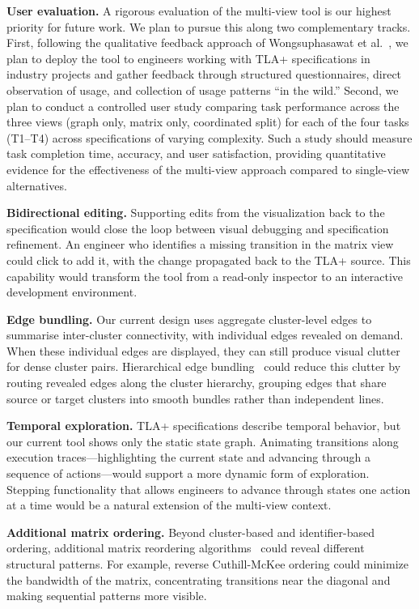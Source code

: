 \documentclass[conference]{IEEEtran}
\begin{document}
\textbf{User evaluation.} A rigorous evaluation of the multi-view tool is our highest priority for future work. We plan to pursue this along two complementary tracks. First, following the qualitative feedback approach of Wongsuphasawat et al.~\cite{wongsuphasawat2018tensorflow}, we plan to deploy the tool to engineers working with TLA+ specifications in industry projects and gather feedback through structured questionnaires, direct observation of usage, and collection of usage patterns ``in the wild.'' Second, we plan to conduct a controlled user study comparing task performance across the three views (graph only, matrix only, coordinated split) for each of the four tasks (T1--T4) across specifications of varying complexity. Such a study should measure task completion time, accuracy, and user satisfaction, providing quantitative evidence for the effectiveness of the multi-view approach compared to single-view alternatives.

\textbf{Bidirectional editing.} Supporting edits from the visualization back to the specification would close the loop between visual debugging and specification refinement. An engineer who identifies a missing transition in the matrix view could click to add it, with the change propagated back to the TLA+ source. This capability would transform the tool from a read-only inspector to an interactive development environment.

\textbf{Edge bundling.} Our current design uses aggregate cluster-level edges to summarise inter-cluster connectivity, with individual edges revealed on demand. When these individual edges are displayed, they can still produce visual clutter for dense cluster pairs. Hierarchical edge bundling~\cite{holten2006hierarchical} could reduce this clutter by routing revealed edges along the cluster hierarchy, grouping edges that share source or target clusters into smooth bundles rather than independent lines.

\textbf{Temporal exploration.} TLA+ specifications describe temporal behavior, but our current tool shows only the static state graph. Animating transitions along execution traces---highlighting the current state and advancing through a sequence of actions---would support a more dynamic form of exploration. Stepping functionality that allows engineers to advance through states one action at a time would be a natural extension of the multi-view context.

\textbf{Additional matrix ordering.} Beyond cluster-based and identifier-based ordering, additional matrix reordering algorithms~\cite{behrisch2016reordering} could reveal different structural patterns. For example, reverse Cuthill-McKee ordering could minimize the bandwidth of the matrix, concentrating transitions near the diagonal and making sequential patterns more visible.
\end{document}
